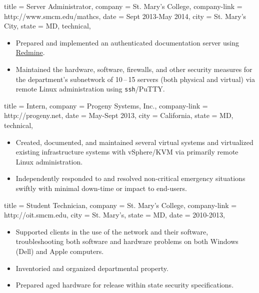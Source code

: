 \documentclass{simplecv}
\begin{document}
\begin{position}
  {
    title   = Server Administrator,
    company = St. Mary's College,
    company-link = http://www.smcm.edu/mathcs,
    date    = Sept 2013-May 2014,
    city    = St. Mary's City,
    state   = MD,
    technical,
  }

\begin{itemize}
\item Prepared and implemented an authenticated documentation server using \href{http://www.redmine.org}{Redmine}.
\item Maintained the hardware, software, firewalls, and other security measures
  for the department's subnetwork of 10\,--\,15 servers (both physical and virtual) via remote Linux administration using \texttt{ssh}\slash PuTTY.
\end{itemize}
\end{position}

\begin{position}
  {
    title   = Intern,
    company = {Progeny Systems, Inc.},
    company-link = http://progeny.net,
    date    = May-Sept 2013,
    city    = California,
    state   = MD,
    technical,
  }

\begin{itemize}
\item Created, documented, and maintained several virtual systems
  and virtualized existing infrastructure systems with vSphere\slash KVM via primarily remote Linux administration.
\item Independently responded to and resolved non-critical emergency situations swiftly
  with minimal down-time or impact to end-users.
\end{itemize}
\end{position}

\begin{position}
  {
    title   = Student Technician,
    company = St. Mary's College,%
    company-link = http://oit.smcm.edu,
    city    = St. Mary's,
    state   = MD,
    date    = 2010-2013,
  }

\begin{itemize}
\item Supported clients in the use of the network and their software,
  troubleshooting both software and hardware problems on both Windows (Dell) and Apple computers.
\item Inventoried and organized departmental property.
\item Prepared aged hardware for release within state security specifications.
\end{itemize}
\end{position}
\end{document}
